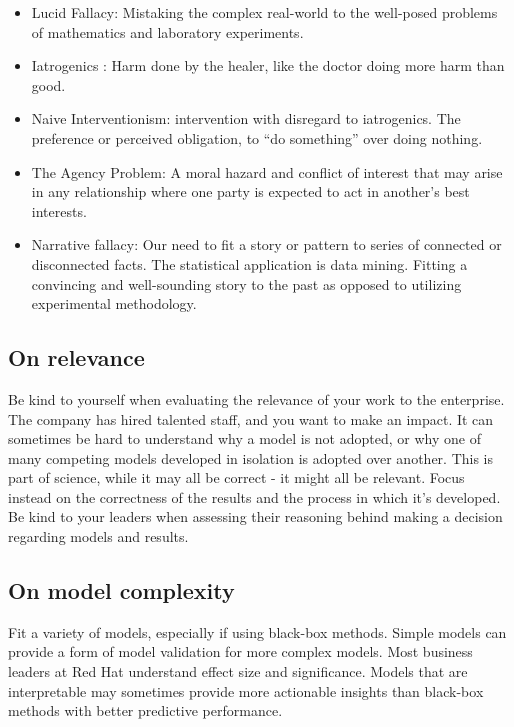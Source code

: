 \documentclass[
  11pt,
]{book}
\begin{document}
\begin{itemize}
\item
  Lucid Fallacy: Mistaking the complex real-world to the well-posed problems of mathematics and laboratory experiments.
\item
  Iatrogenics : Harm done by the healer, like the doctor doing more harm than good.
\item
  Naive Interventionism: intervention with disregard to iatrogenics. The preference or perceived obligation, to ``do something'' over doing nothing.
\item
  The Agency Problem: A moral hazard and conflict of interest that may arise in any relationship where one party is expected to act in another's best interests.
\item
  Narrative fallacy: Our need to fit a story or pattern to series of connected or disconnected facts. The statistical application is data mining. Fitting a convincing and well-sounding story to the past as opposed to utilizing experimental methodology.
\end{itemize}

\hypertarget{on-relevance}{%
\subsection{On relevance}\label{on-relevance}}

Be kind to yourself when evaluating the relevance of your work to the enterprise. The company has hired talented staff, and you want to make an impact. It can sometimes be hard to understand why a model is not adopted, or why one of many competing models developed in isolation is adopted over another. This is part of science, while it may all be correct - it might all be relevant. Focus instead on the correctness of the results and the process in which it's developed. Be kind to your leaders when assessing their reasoning behind making a decision regarding models and results.

\hypertarget{on-model-complexity}{%
\subsection{On model complexity}\label{on-model-complexity}}

Fit a variety of models, especially if using black-box methods. Simple models can provide a form of model validation for more complex models. Most business leaders at Red Hat understand effect size and significance. Models that are interpretable may sometimes provide more actionable insights than black-box methods with better predictive performance.
\end{document}
